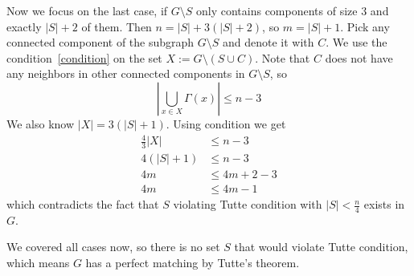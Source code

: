 \begin{exercise}{4}
\begin{itemize}
        Now we focus on the last case, if $G \setminus S$ only contains components
        of size $3$ and exactly $|S| + 2$ of them. Then $n = |S| + 3(|S| + 2)$, so
        $m = |S| + 1$. Pick any connected component of the subgraph $G \setminus S$
        and denote it with $C$. We use the condition~\ref{condition} on the set
        $X := G \setminus (S \cup C)$. Note that $C$ does not have any neighbors in
        other connected components in $G \setminus S$, so
        \begin{equation*}
            \left| \bigcup_{x \in X} \Gamma(x) \right| \leq n - 3
        \end{equation*}
        We also know $|X| = 3 (|S| + 1)$. Using condition we get
        \begin{align*}
            \frac{4}{3} |X| &\leq n - 3 \\
            4 (|S| + 1) &\leq n - 3 \\
            4m &\leq 4m + 2 - 3 \\
            4m &\leq 4m - 1
        \end{align*}
        which contradicts the fact that $S$ violating Tutte condition with $|S|
        < \frac{n}{4}$ exists in $G$.

        We covered all cases now, so there is no set $S$ that would violate
        Tutte condition, which means $G$ has a perfect matching by Tutte's
        theorem.
    \end{itemize}





\end{exercise}
